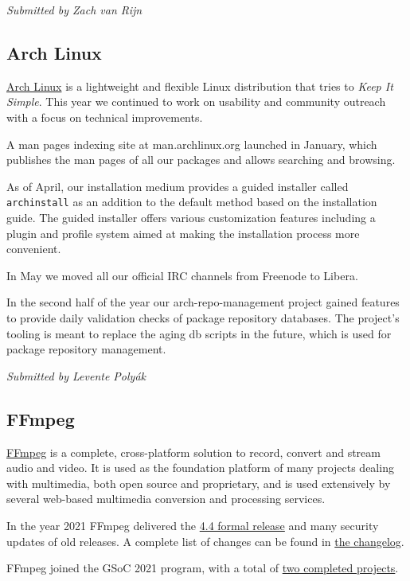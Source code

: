 \documentclass[a4paper]{report}
\begin{document}
{\em Submitted by Zach van Rijn}

\subsection{Arch Linux}

\href{https://archlinux.org/}{Arch Linux} is a lightweight and flexible Linux distribution that tries to \textit{Keep It Simple}.  This year we continued to work on usability and community outreach with a focus on technical improvements.

A man pages indexing site at man.archlinux.org launched in January, which publishes the man pages of all our packages and allows searching and browsing.

As of April, our installation medium provides a guided installer called \texttt{archinstall} as an addition to the default method based on the installation guide. The guided installer offers various customization features including a plugin and profile system aimed at making the installation process more convenient.

In May we moved all our official IRC channels from Freenode to Libera.

In the second half of the year our arch-repo-management project gained features to provide daily validation checks of package repository databases.  The project’s tooling is meant to replace the aging db scripts in the future, which is used for package repository management.

{\em Submitted by Levente Polyák}

\subsection{FFmpeg}

\href{https://www.ffmpeg.org/}{FFmpeg} is a complete, cross-platform solution to record, convert and stream audio and video. It is used as the foundation platform of many projects dealing with multimedia, both open source and proprietary, and is used extensively by several web-based multimedia conversion and processing services.

In the year 2021 FFmpeg delivered the \href{https://git.ffmpeg.org/gitweb/ffmpeg.git/blob/refs/heads/release/4.4:/RELEASE_NOTES}{4.4 formal release} and many security updates of old releases. A complete list of changes can be found in \href{https://git.ffmpeg.org/gitweb/ffmpeg.git/blob/HEAD:/Changelog}{the changelog}.

FFmpeg joined the GSoC 2021 program, with a total of \href{https://trac.ffmpeg.org/wiki/SponsoringPrograms/GSoC/2021/Results}{two completed projects}.
\end{document}
